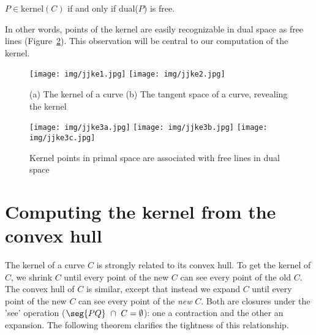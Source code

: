 \documentclass[12pt]{article}
\begin{document}
\begin{corollary}
\label{cor:free}
$P \in \mbox{kernel}(C)$ if and only if dual($P$) is free.
\end{corollary}

\noindent In other words, points of the kernel are easily recognizable in dual space
as free lines (Figure~\ref{fig:freeline}).
This observation will be central to our computation of the kernel.

\clearpage

\begin{figure}
\begin{center}
\texttt{[image: img/jjke1.jpg]}
\texttt{[image: img/jjke2.jpg]}
\end{center}
\caption{(a) The kernel of a curve (b) The tangent space of a curve, revealing the kernel}
\label{fig:kernel}
\end{figure}

\begin{figure}
\begin{center}
\texttt{[image: img/jjke3a.jpg]}
\texttt{[image: img/jjke3b.jpg]}
\texttt{[image: img/jjke3c.jpg]}
\end{center}
\caption{Kernel points in primal space are associated with free lines in dual space}
\label{fig:freeline}
\end{figure}

\clearpage


\section{Computing the kernel from the convex hull}
\label{sec:kernel2hull}

The kernel of a curve $C$
is strongly related to its convex hull.
To get the kernel of $C$, 
we shrink $C$ until every point of the new $C$
can see every point of the old $C$.
The convex hull of $C$ is similar, except that 
instead we expand $C$ until every point of
the new $C$ can see every point of the {\em new} $C$.
Both are closures under the 'see' operation ($\seg{PQ}\ \cap \ C = \emptyset$):
one a contraction and the other an expansion.
The following theorem clarifies the tightness of this relationship.
\end{document}
